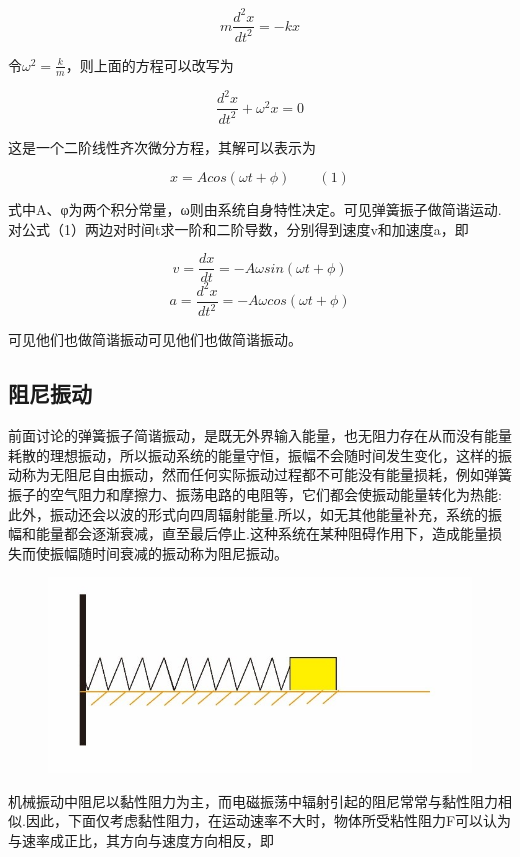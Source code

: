 \documentclass[12pt,a4paper]{ctexart}
\begin{document}
	$$m\frac{d^2x}{dt^2}=-kx$$
	
	令$\omega^2=\frac{k}{m}$，则上面的方程可以改写为
	
	$$\frac{d^2 x}{dt^2}+\omega^2 x =0$$
	
	这是一个二阶线性齐次微分方程，其解可以表示为
	
	$$x=Acos(\omega t+\phi) \qquad(1) $$
	
	式中A、φ为两个积分常量，ω则由系统自身特性决定。可见弹簧振子做简谐运动.
	对公式（1）两边对时间t求一阶和二阶导数，分别得到速度v和加速度a，即
	
	$$v=\frac{dx}{dt}=-A\omega sin(\omega t+\phi)$$
	$$a=\frac{d^2x}{dt^2}=-A\omega cos(\omega t+\phi)$$
	
	可见他们也做简谐振动可见他们也做简谐振动。
	
	\subsection{阻尼振动}
		\indent
		前面讨论的弹簧振子简谐振动，是既无外界输入能量，也无阻力存在从而没有能量耗散的理想振动，所以振动系统的能量守恒，振幅不会随时间发生变化，这样的振动称为无阻尼自由振动，然而任何实际振动过程都不可能没有能量损耗，例如弹簧振子的空气阻力和摩擦力、振荡电路的电阻等，它们都会使振动能量转化为热能:此外，振动还会以波的形式向四周辐射能量.所以，如无其他能量补充，系统的振幅和能量都会逐渐衰减，直至最后停止.这种系统在某种阻碍作用下，造成能量损失而使振幅随时间衰减的振动称为阻尼振动。\\
		
\begin{figure}[h] %
	\centering %
	\centering\includegraphics[height=8\baselineskip]{T12.jpg} %
\end{figure}%
	机械振动中阻尼以黏性阻力为主，而电磁振荡中辐射引起的阻尼常常与黏性阻力相似.因此，下面仅考虑黏性阻力，在运动速率不大时，物体所受粘性阻力F可以认为与速率成正比，其方向与速度方向相反，即
	
\end{document}
